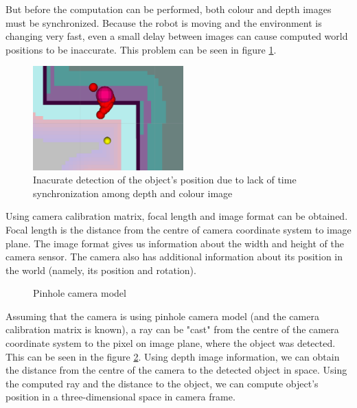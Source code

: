 \documentclass[12pt,a4paper]{article}
\begin{document}
	But before the computation can be performed, both colour and depth images must be synchronized. Because the robot is moving and the environment is changing very fast, even a small delay between images can cause computed world positions to be inaccurate. This problem can be seen in figure \ref{fig:non_synchronized_raw_detection}. \\ 
	
	\begin{figure}[h]
		\centering
		\includegraphics[height=4cm]{images/detections}
		\caption{Inacurate detection of the object's position due to lack of time synchronization among depth and colour image}
		\label{fig:non_synchronized_raw_detection}
	\end{figure}

	Using camera calibration matrix, focal length and image format can be obtained. Focal length is the distance from the centre of camera coordinate system to image plane. The image format gives us information about the width and height of the camera sensor. The camera also has additional information about its position in the world (namely, its position and rotation). \\

	\begin{figure}[h]
		\centering
		\caption{Pinhole camera model}
		\label{fig:pinhole_camera_model}
	\end{figure}
	
	
	Assuming that the camera is using pinhole camera model (and the camera calibration matrix is known), a ray can be "cast" from the centre of the camera coordinate system to the pixel on image plane, where the object was detected. This can be seen in the figure \ref{fig:pinhole_camera_model}. Using depth image information, we can obtain the distance from the centre of the camera to the detected object in space. Using the computed ray and the distance to the object, we can compute object's position in a three-dimensional space in camera frame. \\
	
\end{document}
